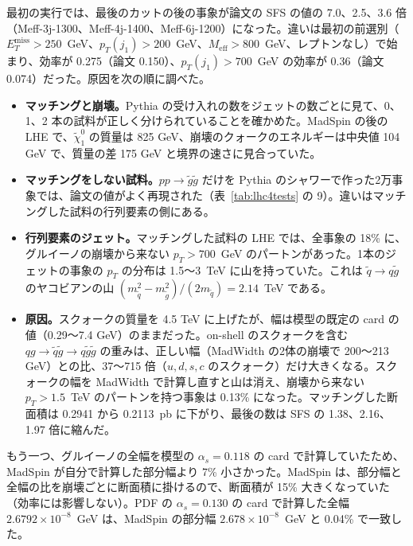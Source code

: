 \documentclass[a4paper,10pt]{ltjsarticle}
\begin{document}
最初の実行では、最後のカットの後の事象が論文の SFS の値の 7.0、2.5、3.6 倍（Meff-3j-1300、Meff-4j-1400、Meff-6j-1200）になった。違いは最初の前選別（$E_T^{\mathrm{miss}}>250$~GeV、$p_T(j_1)>200$~GeV、$M_{\mathrm{eff}}>800$~GeV、レプトンなし）で始まり、効率が 0.275（論文 0.150）、$p_T(j_1)>700$~GeV の効率が 0.36（論文 0.074）だった。原因を次の順に調べた。
\begin{itemize}
\item \textbf{マッチングと崩壊。}Pythia の受け入れの数をジェットの数ごとに見て、0、1、2 本の試料が正しく分けられていることを確かめた。MadSpin の後の LHE で、$\tilde\chi^0_1$ の質量は 825 GeV、崩壊のクォークのエネルギーは中央値 104 GeV で、質量の差 175 GeV と境界の速さに見合っていた。
\item \textbf{マッチングをしない試料。}$pp\to\tilde g\tilde g$ だけを Pythia のシャワーで作った2万事象では、論文の値がよく再現された（表~\ref{tab:lhc4tests} の 9）。違いはマッチングした試料の行列要素の側にある。
\item \textbf{行列要素のジェット。}マッチングした試料の LHE では、全事象の 18\% に、グルイーノの崩壊から来ない $p_T>700$~GeV のパートンがあった。1本のジェットの事象の $p_T$ の分布は 1.5〜3~TeV に山を持っていた。これは $\tilde q\to q\tilde g$ のヤコビアンの山 $(m_{\tilde q}^2-m_{\tilde g}^2)/(2m_{\tilde q})=2.14$~TeV である。
\item \textbf{原因。}スクォークの質量を 4.5 TeV に上げたが、幅は模型の既定の card の値（0.29〜7.4 GeV）のままだった。on-shell のスクォークを含む $qg\to\tilde q\tilde g\to q\tilde g\tilde g$ の重みは、正しい幅（MadWidth の2体の崩壊で 200〜213 GeV）との比、37〜715 倍（$u,d,s,c$ のスクォーク）だけ大きくなる。スクォークの幅を MadWidth で計算し直すと山は消え、崩壊から来ない $p_T>1.5$~TeV のパートンを持つ事象は 0.13\% になった。マッチングした断面積は 0.2941 から 0.2113~pb に下がり、最後の数は SFS の 1.38、2.16、1.97 倍に縮んだ。
\end{itemize}
もう一つ、グルイーノの全幅を模型の $\alpha_s=0.118$ の card で計算していたため、MadSpin が自分で計算した部分幅より 7\% 小さかった。MadSpin は、部分幅と全幅の比を崩壊ごとに断面積に掛けるので、断面積が 15\% 大きくなっていた（効率には影響しない）。PDF の $\alpha_s=0.130$ の card で計算した全幅 $2.6792\times10^{-8}$~GeV は、MadSpin の部分幅 $2.678\times10^{-8}$~GeV と 0.04\% で一致した。
\end{document}
